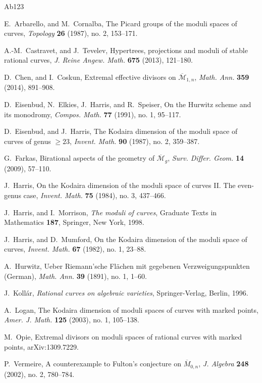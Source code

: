 \documentclass[11]{amsart}
\theoremstyle{plain}
\theoremstyle{definition}
\newcommand{\BM}{\overline{\mathcal M}}
\begin{document}
\begin{thebibliography}{Ab123}


   E.~Arbarello, and M.~Cornalba, The {P}icard groups of the moduli spaces of curves,
   {\em Topology} {\bf 26} (1987), no. 2, 153--171.

	A.-M.~Castravet,  and J.~Tevelev, Hypertrees, projections and moduli of stable rational curves,
	{\em J. Reine Angew. Math.} {\bf 675} (2013), 121--180. 
	
	
D.~Chen, and I.~Coskun, Extremal effective divisors on $\BM_{1,n}$, 
{\em Math. Ann.} {\bf 359} (2014), 891--908. 

D.~Eisenbud, N.~Elkies, J.~Harris, and R.~Speiser, On the Hurwitz scheme and its monodromy, 
{\em Compos. Math.} {\bf 77} (1991), no. 1, 95--117. 


	D.~Eisenbud, and J.~Harris, 
	The Kodaira dimension of the moduli space of curves of genus $\geq 23$,
	{\em Invent. Math.}
	{\bf 90} (1987), no. 2, 359--387.
	
  G.~Farkas, Birational aspects of the geometry of $\BM_g$,
  {\em Surv. Differ. Geom.}
   {\bf 14} (2009), 57--110. 

	J.~Harris, 
	On the {K}odaira dimension of the moduli space of curves {II}. The even-genus case, 
	{\em Invent. Math.}
	 {\bf 75} (1984), no. 3, 437--466.

   J.~Harris, and I.~Morrison, {\em The moduli of curves}, Graduate Texts in Mathematics {\bf 187}, Springer, New York, 1998.

	J.~Harris, and D.~Mumford, 
	On the Kodaira dimension of the moduli space of curves,
	{\em Invent. Math.}
	 {\bf 67} (1982), no. 1, 23--88.
	 
A.~Hurwitz, Ueber Riemann'sche Fl\"achen mit gegebenen Verzweigungspunkten	(German), 
{\em Math. Ann.} {\bf 39} (1891), no. 1, 1--60. 

   J.~Koll\'ar, {\em Rational curves on algebraic varieties}, 
   Springer-Verlag, Berlin, 1996.

	A.~Logan, 
	The Kodaira dimension of moduli spaces of curves with marked points,
	 {\em Amer. J. Math.} {\bf 125} (2003), no. 1, 105--138.
	 
         M.~Opie, 	 
         Extremal divisors on moduli spaces of rational curves with marked points, 
         arXiv:1309.7229. 
	 
	P.~Vermeire,  A counterexample to Fulton's conjecture on $\overline{M}_{0,n}$,
	{\em J. Algebra} {\bf 248} (2002),  no. 2, 780--784.

\end{thebibliography}
\end{document}
